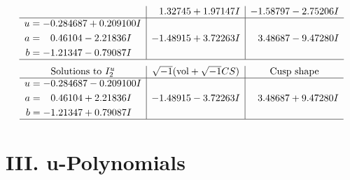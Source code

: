 \documentclass[1p]{elsarticle_modified}
\theoremstyle{definition}
\newcommand{\I}{\sqrt{-1}}
\begin{document}
$$\begin{array}{c|c|c}
 & \phantom{-}1.32745 + 1.97147 I & -1.58797 - 2.75206 I \\ \hline\begin{aligned}
u &= -0.284687 + 0.209100 I \\
a &= \phantom{-}0.46104 - 2.21836 I \\
b &= -1.21347 - 0.79087 I\end{aligned}
 & -1.48915 + 3.72263 I & \phantom{-}3.48687 - 9.47280 I\\
 \hline 
 \end{array}$$\newpage$$\begin{array}{c|c|c}  
\text{Solutions to }I^u_{2}& \I (\text{vol} + \sqrt{-1}CS) & \text{Cusp shape}\\
 \hline 
\begin{aligned}
u &= -0.284687 - 0.209100 I \\
a &= \phantom{-}0.46104 + 2.21836 I \\
b &= -1.21347 + 0.79087 I\end{aligned}
 & -1.48915 - 3.72263 I & \phantom{-}3.48687 + 9.47280 I\\
 \hline 
 \end{array}$$\newpage
\newpage\renewcommand{\arraystretch}{1}
\centering \section*{ III. u-Polynomials}
\end{document}
